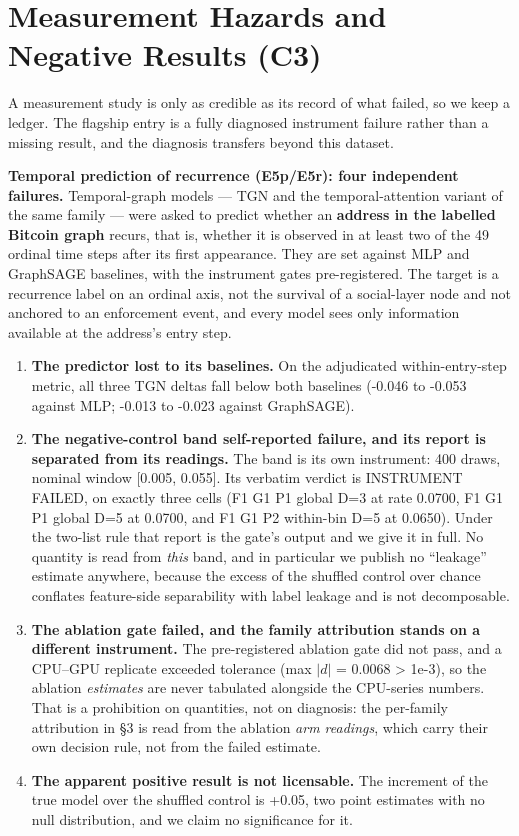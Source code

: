 \section{Measurement Hazards and Negative Results (C3)}

A measurement study is only as credible as its record of what failed, so we keep
a ledger. The flagship entry is a fully diagnosed instrument failure rather than
a missing result, and the diagnosis transfers beyond this dataset.

\textbf{Temporal prediction of recurrence (E5p/E5r): four independent failures.}
Temporal-graph models --- TGN \citep{rossi2020temporal} and the temporal-attention
variant of the same family \citep{xu2020inductive} --- were asked to predict
whether an \textbf{address in the labelled Bitcoin graph} recurs, that is,
whether it is observed in at least two of the 49 ordinal time steps after its
first appearance. They are set against MLP and GraphSAGE \citep{hamilton2017inductive}
baselines, with the instrument gates pre-registered. The target is a recurrence
label on an ordinal axis, not the survival of a social-layer node and not
anchored to an enforcement event, and every model sees only information available
at the address's entry step.

\begin{enumerate}\itemsep1pt
\item \textbf{The predictor lost to its baselines.} On the adjudicated
within-entry-step metric, all three TGN deltas fall below both baselines
(-0.046 to -0.053 against MLP; -0.013 to -0.023 against GraphSAGE).
\item \textbf{The negative-control band self-reported failure, and its report is
separated from its readings.} The band is its own instrument: 400 draws, nominal
window [0.005, 0.055]. Its verbatim verdict is INSTRUMENT FAILED, on exactly
three cells (F1 G1 P1 global D=3 at rate 0.0700, F1 G1 P1 global D=5 at 0.0700,
and F1 G1 P2 within-bin D=5 at 0.0650). Under the two-list rule that report is
the gate's output and we give it in full. No quantity is read from \emph{this}
band, and in particular we publish no ``leakage'' estimate anywhere, because the
excess of the shuffled control over chance conflates feature-side separability
with label leakage and is not decomposable.
\item \textbf{The ablation gate failed, and the family attribution stands on a
different instrument.} The pre-registered ablation gate did not pass, and a
CPU--GPU replicate exceeded tolerance (max $|d|$ = 0.0068 \textgreater{} 1e-3),
so the ablation \emph{estimates} are never tabulated alongside the CPU-series
numbers. That is a prohibition on quantities, not on diagnosis: the per-family
attribution in \S3 is read from the ablation \emph{arm readings}, which carry
their own decision rule, not from the failed estimate.
\item \textbf{The apparent positive result is not licensable.} The increment of
the true model over the shuffled control is +0.05, two point estimates with no
null distribution, and we claim no significance for it.
\end{enumerate}

